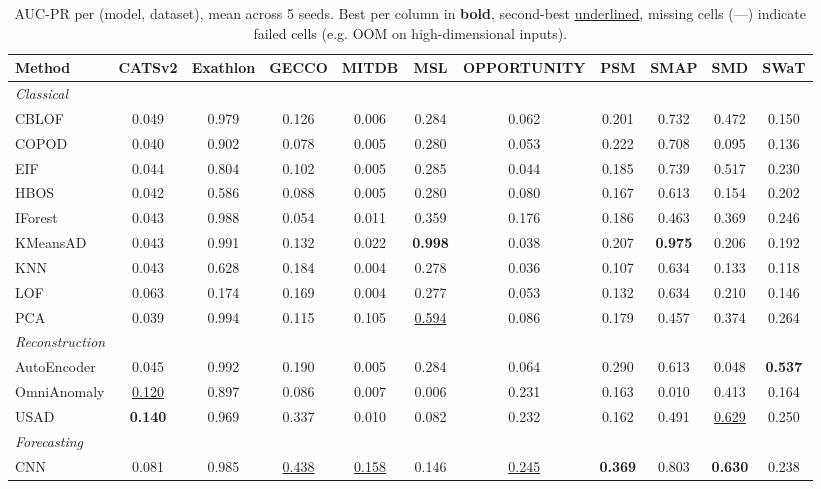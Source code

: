 \begin{table}[t]
\centering
\small
\caption{AUC-PR per (model, dataset), mean across 5 seeds. Best per column in \textbf{bold}, second-best \underline{underlined}, missing cells (---) indicate failed cells (e.g. OOM on high-dimensional inputs).}
\label{tab:by-dataset-auc-pr}
\begin{tabular}{lcccccccccc}
\toprule
Method & CATSv2 & Exathlon & GECCO & MITDB & MSL & OPPORTUNITY & PSM & SMAP & SMD & SWaT \\
\midrule
\multicolumn{11}{l}{\textit{Classical}} \\
CBLOF & 0.049 & 0.979 & 0.126 & 0.006 & 0.284 & 0.062 & 0.201 & 0.732 & 0.472 & 0.150 \\
COPOD & 0.040 & 0.902 & 0.078 & 0.005 & 0.280 & 0.053 & 0.222 & 0.708 & 0.095 & 0.136 \\
EIF & 0.044 & 0.804 & 0.102 & 0.005 & 0.285 & 0.044 & 0.185 & 0.739 & 0.517 & 0.230 \\
HBOS & 0.042 & 0.586 & 0.088 & 0.005 & 0.280 & 0.080 & 0.167 & 0.613 & 0.154 & 0.202 \\
IForest & 0.043 & 0.988 & 0.054 & 0.011 & 0.359 & 0.176 & 0.186 & 0.463 & 0.369 & 0.246 \\
KMeansAD & 0.043 & 0.991 & 0.132 & 0.022 & \textbf{0.998} & 0.038 & 0.207 & \textbf{0.975} & 0.206 & 0.192 \\
KNN & 0.043 & 0.628 & 0.184 & 0.004 & 0.278 & 0.036 & 0.107 & 0.634 & 0.133 & 0.118 \\
LOF & 0.063 & 0.174 & 0.169 & 0.004 & 0.277 & 0.053 & 0.132 & 0.634 & 0.210 & 0.146 \\
PCA & 0.039 & 0.994 & 0.115 & 0.105 & \underline{0.594} & 0.086 & 0.179 & 0.457 & 0.374 & 0.264 \\
\midrule
\multicolumn{11}{l}{\textit{Reconstruction}} \\
AutoEncoder & 0.045 & 0.992 & 0.190 & 0.005 & 0.284 & 0.064 & 0.290 & 0.613 & 0.048 & \textbf{0.537} \\
OmniAnomaly & \underline{0.120} & 0.897 & 0.086 & 0.007 & 0.006 & 0.231 & 0.163 & 0.010 & 0.413 & 0.164 \\
USAD & \textbf{0.140} & 0.969 & 0.337 & 0.010 & 0.082 & 0.232 & 0.162 & 0.491 & \underline{0.629} & 0.250 \\
\midrule
\multicolumn{11}{l}{\textit{Forecasting}} \\
CNN & 0.081 & 0.985 & \underline{0.438} & \underline{0.158} & 0.146 & \underline{0.245} & \textbf{0.369} & 0.803 & \textbf{0.630} & 0.238 \\

\end{tabular}
\end{table}
